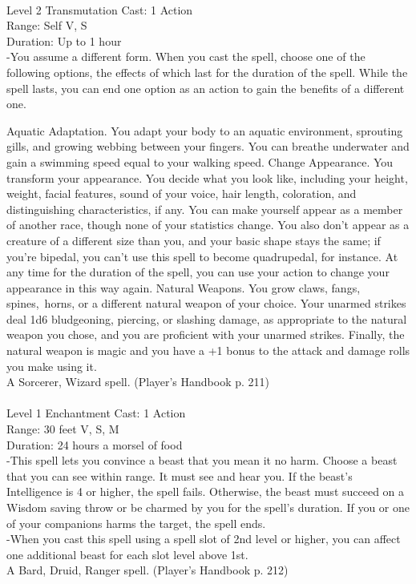 \documentclass[10pt,twocolumn]{report}
\begin{document}
 \\
Level 2 \quad Transmutation \quad Cast: 1 Action\\
Range: Self \quad V, S\\
Duration: Up to 1 hour \quad \\
-You assume a different form.
When you cast the spell, choose one of the following options, the effects of which last for the duration of the spell. While the spell lasts, you can end one option as an action to gain the benefits of a different one.

Aquatic Adaptation. You adapt your body to an aquatic environment, sprouting gills, and growing webbing between your fingers. You can breathe underwater and gain a swimming speed equal to your walking speed.
Change Appearance. You transform your appearance. You decide what you look like, including your height, weight, facial features, sound of your voice, hair length, coloration, and distinguishing characteristics, if any. You can make yourself appear as a member of another race, though none of your statistics change. You also don’t appear as a creature of a different size than you, and your basic shape stays the same; if you're bipedal, you can’t use this spell to become quadrupedal, for instance. At any time for the duration of the spell, you can use your action to change your appearance in this way again.
Natural Weapons. You grow claws, fangs, spines, horns, or a different natural weapon of your choice. Your unarmed strikes deal 1d6 bludgeoning, piercing, or slashing damage, as appropriate to the natural weapon you chose, and you are proficient with your unarmed strikes. Finally, the natural weapon is magic and you have a +1 bonus to the attack and damage rolls you make using it.\\
A Sorcerer, Wizard spell. (Player's Handbook p. 211) \\


 \\
Level 1 \quad Enchantment \quad Cast: 1 Action\\
Range: 30 feet \quad V, S, M\\
Duration: 24 hours \quad a morsel of food\\
-This spell lets you convince a beast that you mean it no harm.
Choose a beast that you can see within range. It must see and hear you. If the beast’s Intelligence is 4 or higher, the spell fails. Otherwise, the beast must succeed on a Wisdom saving throw or be charmed by you for the spell’s duration. If you or one of your companions harms the target, the spell ends.\\
-When you cast this spell using a spell slot of 2nd level or higher, you can affect one additional beast for each slot level above 1st.\\
A Bard, Druid, Ranger spell. (Player's Handbook p. 212) \\
\end{document}
